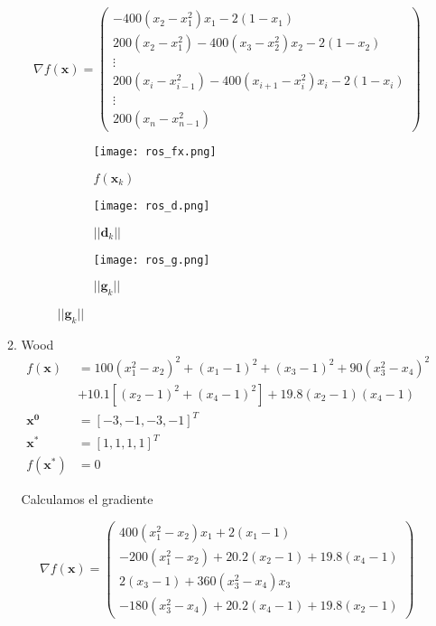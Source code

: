 \documentclass{article}
\begin{document}
\begin{enumerate}
\begin{enumerate}
  $$\nabla f(\boldsymbol{x}) = 
   \begin{pmatrix}
    -400(x_2 - x_1^2)x_1 - 2(1 - x_1) \\
    200(x_2 - x_1^2) - 400(x_3 - x_2^2)x_2 - 2(1 - x_2)\\
    \vdots\\
    200(x_{i} - x_{i-1}^2) - 400(x_{i+1} - x_i^2)x_i - 2(1 - x_i)\\
    \vdots\\
    200(x_{n} - x_{n-1}^2)
   \end{pmatrix}$$

  \begin{figure}[ht]
    \centering
    \begin{subfigure}[b]{0.3\linewidth}
        \centering
        \texttt{[image: ros\_fx.png]}
        \caption{$f(\boldsymbol{x}_k)$}
        \label{ros_f}
    \end{subfigure}
    \begin{subfigure}[b]{0.3\linewidth}
        \centering
        \texttt{[image: ros\_d.png]}
        \caption{$||\boldsymbol{d}_k||$}
        \label{ros_d}
    \end{subfigure}
    \begin{subfigure}[b]{0.3\linewidth}
        \centering
        \texttt{[image: ros\_g.png]}
        \caption{$||\boldsymbol{g}_k||$}
        \label{ros_g}
    \end{subfigure}
  \end{figure}

  \item Wood
  \begin{align*} 
  f(\boldsymbol{x}) &= 100(x_1^2-x_2)^2+(x_1-1)^2+(x_3-1)^2
  +90(x_3^2-x_4)^2\\&+10.1[(x_2-1)^2+(x_4-1)^2]+19.8(x_2-1)(x_4-1) \\
  \boldsymbol{x^0} &= [-3, -1, -3, -1]^T \\
  \boldsymbol{x^*} &= [1, 1, 1, 1]^T \\
  f(\boldsymbol{x^*}) &= 0
  \end{align*}

  Calculamos el gradiente

  $$\nabla f(\boldsymbol{x}) = 
   \begin{pmatrix}
    400(x_1^2 - x_2)x_1 + 2(x_1 - 1) \\
    -200(x_1^2 - x_2) + 20.2(x_2 - 1) + 19.8(x_4 - 1)\\
    2(x_3 - 1) + 360(x_3^2 - x_4)x_3\\
    -180(x_3^2 - x_4) + 20.2(x_4 - 1) + 19.8(x_2 - 1)
   \end{pmatrix}$$




\end{enumerate}
\end{enumerate}
\end{document}
